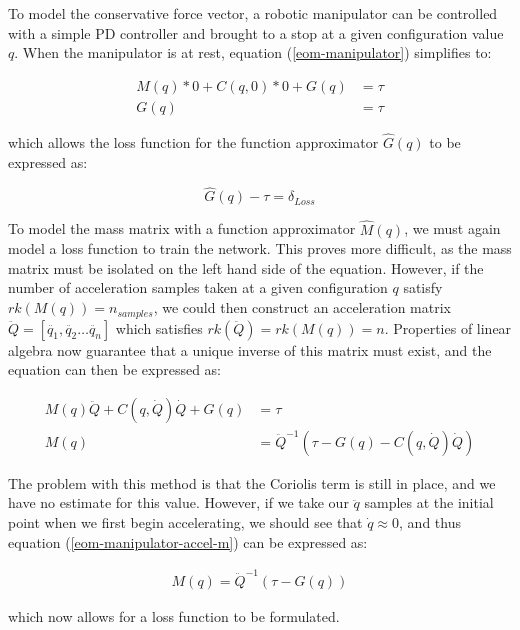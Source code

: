 To model the conservative force vector, a robotic manipulator can be controlled
with a simple PD controller and brought to a stop at a given configuration value
$q$.
When the manipulator is at rest, equation (\ref{eom-manipulator}) simplifies to:

\begin{align}
  \label{eom-manipulator-stopped}
  M(q)*0 + C(q,0)*0 + G(q) &= \tau\\
  G(q) &= \tau
\end{align}

\noindent which allows the loss function for the function approximator
$\hat{G}(q)$ to be expressed as:

\begin{equation}
  \label{loss-function-gq}
  \hat{G}(q) - \tau = \delta_{Loss}
\end{equation}

To model the mass matrix with a function approximator $\hat{M}(q)$, we must
again model a loss function to train the network.
This proves more difficult, as the mass matrix must be isolated on the left hand
side of the equation.
However, if the number of acceleration samples taken at a given configuration
$q$ satisfy $rk(M(q)) = n_{samples}$, we could then construct an acceleration
matrix $\ddot{Q} = [\ddot{q_{1}}, \ddot{q_{2}}\dots\ddot{q_{n}}]$ which
satisfies $rk(\ddot{Q}) = rk(M(q)) = n$.
Properties of linear algebra now guarantee that a unique inverse of this matrix
must exist, and the equation can then be expressed as:

\begin{align}
  \label{eom-manipulator-accel}
  M(q)\ddot{Q} + C(q,\dot{Q})\dot{Q} + G(q) &= \tau\\
  \label{eom-manipulator-accel-m}
  M(q) &= \ddot{Q}^{-1}(\tau - G(q) - C(q,\dot{Q})\dot{Q})
\end{align}

The problem with this method is that the Coriolis term is still in place, and we
have no estimate for this value.
However, if we take our $\ddot{q}$ samples at the initial point when we first
begin accelerating, we should see that $\dot{q} \approx 0$, and thus equation
(\ref{eom-manipulator-accel-m}) can be expressed as:

\begin{align}
  M(q) = \ddot{Q}^{-1}(\tau - G(q))
\end{align}

\noindent which now allows for a loss function to be formulated.

